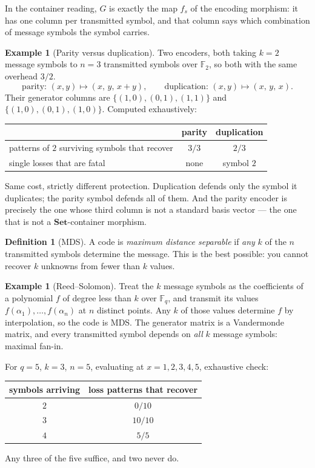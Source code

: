 \documentclass[11pt,a4paper]{article}
\theoremstyle{definition}
\newtheorem{definition}[theorem]{Definition}
\newtheorem{example}[theorem]{Example}
\theoremstyle{remark}
\newcommand{\FF}{\mathbb{F}}
\newcommand{\cat}[1]{\mathbf{#1}}
\newcommand{\Set}{\cat{Set}}
\begin{document}
In the container reading, $G$ is exactly the map $f_s$ of the encoding morphism: it
has one column per transmitted symbol, and that column says which combination of
message symbols the symbol carries.

\begin{example}[Parity versus duplication]\label{ex:parity}
Two encoders, both taking $k=2$ message symbols to $n=3$ transmitted symbols over
$\FF_2$, so both with the same overhead $3/2$.
\[
  \text{parity: } (x,y) \mapsto (x,\, y,\, x+y),
  \qquad
  \text{duplication: } (x,y) \mapsto (x,\, y,\, x).
\]
Their generator columns are
$\{(1,0), (0,1), (1,1)\}$ and $\{(1,0), (0,1), (1,0)\}$. Computed exhaustively:
\begin{center}
\small
\begin{tabular}{lcc}
\toprule
 & parity & duplication \\
\midrule
patterns of $2$ surviving symbols that recover & $3/3$ & $2/3$ \\
single losses that are fatal & none & symbol $2$ \\
\bottomrule
\end{tabular}
\end{center}
Same cost, strictly different protection. Duplication defends only the symbol it
duplicates; the parity symbol defends all of them. And the parity encoder is precisely
the one whose third column is not a standard basis vector --- the one that is not a
$\Set$-container morphism.
\end{example}

\begin{definition}[MDS]
A code is \emph{maximum distance separable} if \emph{any} $k$ of the $n$ transmitted
symbols determine the message. This is the best possible: you cannot recover $k$
unknowns from fewer than $k$ values.
\end{definition}

\begin{example}[Reed--Solomon]\label{ex:rs}
Treat the $k$ message symbols as the coefficients of a polynomial $f$ of degree less
than $k$ over $\FF_q$, and transmit its values $f(\alpha_1), \dots, f(\alpha_n)$ at
$n$ distinct points. Any $k$ of those values determine $f$ by interpolation, so the
code is MDS. The generator matrix is a Vandermonde matrix, and every transmitted
symbol depends on \emph{all} $k$ message symbols: maximal fan-in.

For $q = 5$, $k = 3$, $n = 5$, evaluating at $x = 1,2,3,4,5$, exhaustive check:
\begin{center}
\small
\begin{tabular}{cc}
\toprule
symbols arriving & loss patterns that recover \\
\midrule
$2$ & $0/10$ \\
$3$ & $10/10$ \\
$4$ & $5/5$ \\
\bottomrule
\end{tabular}
\end{center}
Any three of the five suffice, and two never do.
\end{example}
\end{document}
